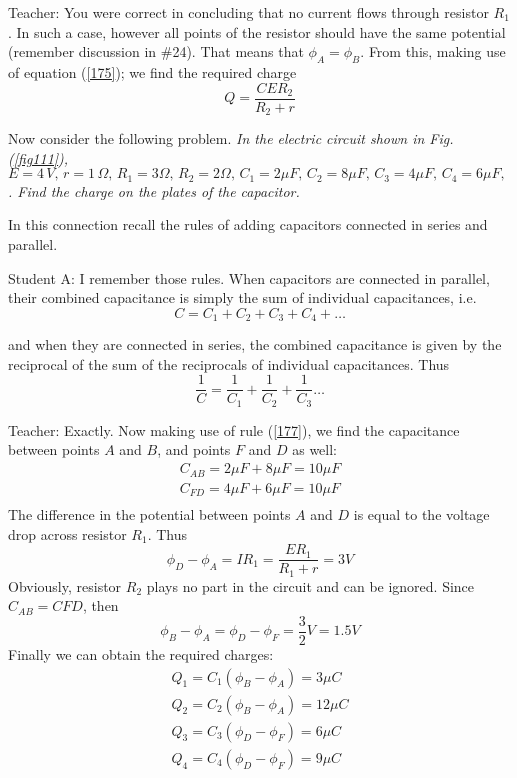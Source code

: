 \documentclass[a4paper,12pt]{book}
\begin{document}
{\sc Teacher:} You were correct in concluding that no current flows through resistor $R_{1}$. In such a case, however all points of the resistor should have the same potential (remember discussion in \#24). That means that $\phi_{A} = \phi_{B}$. From this, making use of equation (\ref{175}); we find the required charge
\begin{equation}
Q = \frac{C E R_{2}}{R_{2}+ r}
\end{equation}

Now consider the following problem. \emph{In the electric circuit shown in Fig. (\ref{fig111}), $E = 4 \,V, \,r =1 \, \Omega, \, R_{1} = 3 \Omega,\, R_{2} = 2 \Omega,\, C_{1} = 2 \mu F, \, C_{2} = 8 \mu F,\, C_{3} = 4 \mu F,\, C_{4} = 6 \mu F,\,$. Find the charge on the plates of the capacitor.}

In this connection recall the rules of adding capacitors connected in series and parallel.

{\sc Student A:} I remember those rules. When capacitors are connected in parallel, their combined capacitance is simply the sum of individual capacitances, i.e. 
\begin{equation}
C = C_{1} + C_{2} +C_{3} +C_{4} +\ldots \label{177}
\end{equation}

 and when they are connected in series, the combined capacitance is given by the reciprocal of the sum of the reciprocals of individual capacitances. Thus
 \begin{equation}
\frac{1}{C} = \frac{1}{C_{1}}+ \frac{1}{C_{2}}+ \frac{1}{C_{3}} \ldots \label{178}
\end{equation}

{\sc Teacher:} Exactly. Now making use of rule (\ref{177}), we find the capacitance between points $A$ and $B$, and points $F$ and $D$ as well:
\begin{eqnarray*}
C_{AB} = 2 \mu F + 8 \mu F = 10 \mu F \\
C_{FD} = 4 \mu F + 6 \mu F = 10 \mu F \\
\end{eqnarray*}
The difference in the potential between points $A$ and $D$ is equal to the voltage drop across resistor $R_{1}$. Thus 
\begin{equation*}
\phi_{D} - \phi_{A} = IR_{1} = \frac{ER_{1}}{R_{1} + r} = 3 V
\end{equation*}
Obviously, resistor $R_{2}$ plays no part in the circuit and can be ignored. 
Since $C_{AB} = C{FD}$, then
\begin{equation*}
\phi_{B} - \phi_{A} = \phi_{D} - \phi_{F} = \frac{3}{2} V = 1.5 V
\end{equation*}
Finally we can obtain the required charges:
\begin{eqnarray*}
Q_{1} = C_{1}(\phi_{B} - \phi_{A}) = 3 \mu C \\
Q_{2} = C_{2}(\phi_{B} - \phi_{A}) = 12 \mu C \\
Q_{3} = C_{3}(\phi_{D} - \phi_{F}) = 6 \mu C \\
Q_{4} = C_{4}(\phi_{D} - \phi_{F}) = 9 \mu C \\
\end{eqnarray*}
\end{document}
